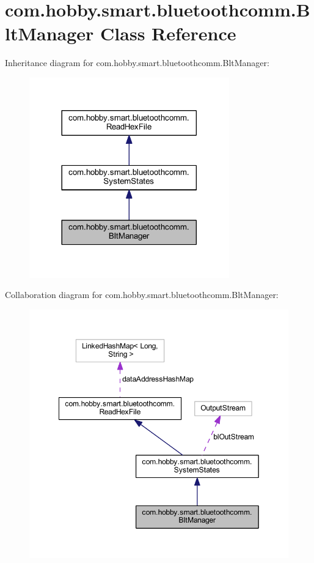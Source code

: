 \hypertarget{classcom_1_1hobby_1_1smart_1_1bluetoothcomm_1_1_blt_manager}{}\section{com.\+hobby.\+smart.\+bluetoothcomm.\+Blt\+Manager Class Reference}
\label{classcom_1_1hobby_1_1smart_1_1bluetoothcomm_1_1_blt_manager}


Inheritance diagram for com.\+hobby.\+smart.\+bluetoothcomm.\+Blt\+Manager\+:\nopagebreak
\begin{figure}[H]
\begin{center}
\leavevmode
\includegraphics[width=245pt]{classcom_1_1hobby_1_1smart_1_1bluetoothcomm_1_1_blt_manager__inherit__graph}
\end{center}
\end{figure}


Collaboration diagram for com.\+hobby.\+smart.\+bluetoothcomm.\+Blt\+Manager\+:\nopagebreak
\begin{figure}[H]
\begin{center}
\leavevmode
\includegraphics[width=349pt]{classcom_1_1hobby_1_1smart_1_1bluetoothcomm_1_1_blt_manager__coll__graph}
\end{center}
\end{figure}
